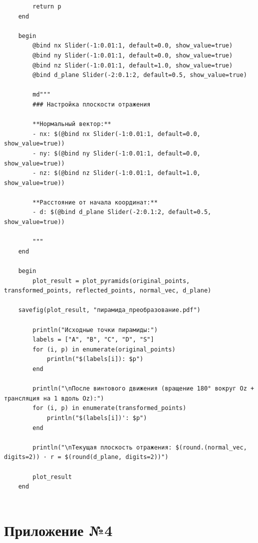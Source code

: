 \begin{verbatim}
        return p
    end

    begin
        @bind nx Slider(-1:0.01:1, default=0.0, show_value=true)
        @bind ny Slider(-1:0.01:1, default=0.0, show_value=true)
        @bind nz Slider(-1:0.01:1, default=1.0, show_value=true)
        @bind d_plane Slider(-2:0.1:2, default=0.5, show_value=true)
        
        md"""
        ### Настройка плоскости отражения
        
        **Нормальный вектор:**
        - nx: $(@bind nx Slider(-1:0.01:1, default=0.0, show_value=true))
        - ny: $(@bind ny Slider(-1:0.01:1, default=0.0, show_value=true))
        - nz: $(@bind nz Slider(-1:0.01:1, default=1.0, show_value=true))
        
        **Расстояние от начала координат:**
        - d: $(@bind d_plane Slider(-2:0.1:2, default=0.5, show_value=true))
        
        """
    end

    begin
        plot_result = plot_pyramids(original_points, transformed_points, reflected_points, normal_vec, d_plane)

    savefig(plot_result, "пирамида_преобразование.pdf")
        
        println("Исходные точки пирамиды:")
        labels = ["A", "B", "C", "D", "S"]
        for (i, p) in enumerate(original_points)
            println("$(labels[i]): $p")
        end
        
        println("\nПосле винтового движения (вращение 180° вокруг Oz + трансляция на 1 вдоль Oz):")
        for (i, p) in enumerate(transformed_points)
            println("$(labels[i])': $p")
        end
        
        println("\nТекущая плоскость отражения: $(round.(normal_vec, digits=2)) · r = $(round(d_plane, digits=2))")
        
        plot_result
    end
    
\end{verbatim}

\section{Приложение №4}

